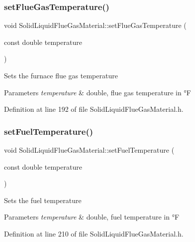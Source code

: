 \subsubsection{\texorpdfstring{set\+Flue\+Gas\+Temperature()}{setFlueGasTemperature()}}
{\footnotesize\ttfamily void Solid\+Liquid\+Flue\+Gas\+Material\+::set\+Flue\+Gas\+Temperature (\begin{DoxyParamCaption}\item[{const double}]{temperature }\end{DoxyParamCaption})\hspace{0.3cm}{\ttfamily [inline]}}

Sets the furnace flue gas temperature 
\begin{DoxyParams}{Parameters}
{\em temperature} & double, flue gas temperature in °F \\
\hline
\end{DoxyParams}


Definition at line 192 of file Solid\+Liquid\+Flue\+Gas\+Material.\+h.

\mbox{\label{class_solid_liquid_flue_gas_material_a420ba1234c5f8c4b93f190b61046a589}} 
\subsubsection{\texorpdfstring{set\+Fuel\+Temperature()}{setFuelTemperature()}}
{\footnotesize\ttfamily void Solid\+Liquid\+Flue\+Gas\+Material\+::set\+Fuel\+Temperature (\begin{DoxyParamCaption}\item[{const double}]{temperature }\end{DoxyParamCaption})\hspace{0.3cm}{\ttfamily [inline]}}

Sets the fuel temperature 
\begin{DoxyParams}{Parameters}
{\em temperature} & double, fuel temperature in °F \\
\hline
\end{DoxyParams}


Definition at line 210 of file Solid\+Liquid\+Flue\+Gas\+Material.\+h.

\mbox{\label{class_solid_liquid_flue_gas_material_a6046d06703bd496745121b62eab4f40f}} 
